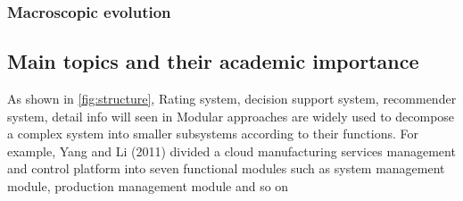 
\subsubsection{Macroscopic evolution} %
\label{ssub:macroscopic_evolution}




\subsection{Main topics and their academic importance}
As shown in \autoref{fig:structure},
Rating system, decision support system, recommender system,
detail info will seen in
Modular approaches are widely used to decompose a complex system into smaller subsystems according to their functions. For example, Yang and Li (2011) divided a cloud manufacturing services management and control platform into seven functional modules such as system management module, production management module and so on

